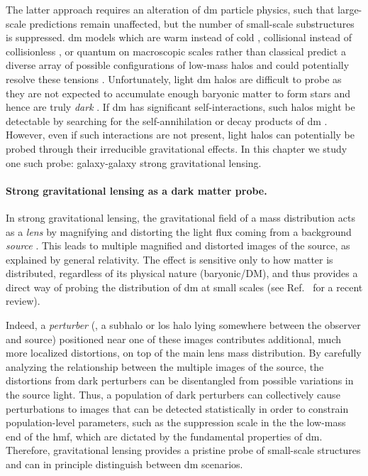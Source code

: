 The latter approach requires an alteration of \gls*{dm} particle physics, such that large-scale predictions remain unaffected, but the number of small-scale substructures is suppressed. \Gls*{dm} models which are warm instead of cold \cite{Colin:2000dn,Hogan:2000bv, Lovell:2013ola}, collisional instead of collisionless \cite{Spergel:1999mh}, or quantum on macroscopic scales rather than classical \cite{Hu:2000ke} predict a diverse array of possible configurations of low-mass halos and could potentially resolve these tensions \cite{Buckley:2017ijx}. Unfortunately, light \gls*{dm} halos are difficult to probe as they are not expected to accumulate enough baryonic matter to form stars and hence are truly \emph{dark} \cite{Efstathiou:1992zz,Fitts:2016usl}. If \gls*{dm} has significant self-interactions, such halos might be detectable by searching for the self-annihilation or decay products of \gls*{dm} \cite{Adhikari:2022sbh}. However, even if such interactions are not present, light halos can potentially be probed through their irreducible gravitational effects. In this chapter we study one such probe: galaxy-galaxy strong gravitational lensing.

\paragraph*{Strong gravitational lensing as a dark matter probe.} In strong gravitational lensing, the gravitational field of a mass distribution acts as a \emph{lens} by magnifying and distorting the light flux coming from a background \emph{source} \cite{Kochanek:aa}. This leads to multiple magnified and distorted images of the source, as explained by general relativity. The effect is sensitive only to how matter is distributed, regardless of its physical nature (baryonic/DM), and thus provides a direct way of probing the distribution of \gls*{dm} at small scales (see Ref.~\cite{Vegetti:2023mgp} for a recent review). 



Indeed, a \emph{perturber} (\ie, a subhalo or \gls*{los} halo lying somewhere between the observer and source) positioned near one of these images contributes additional, much more localized distortions, on top of the main lens mass distribution. By carefully analyzing the relationship between the multiple images of the source, the distortions from dark perturbers can be disentangled from possible variations in the source light. Thus, a population of dark perturbers can collectively cause perturbations to images that can be detected statistically in order to constrain population-level parameters, such as the suppression scale in the the low-mass end of the \gls*{hmf}, which are dictated by the fundamental properties of \gls*{dm}. Therefore, gravitational lensing provides a pristine probe of small-scale structures and can in principle distinguish between \gls*{dm} scenarios.

